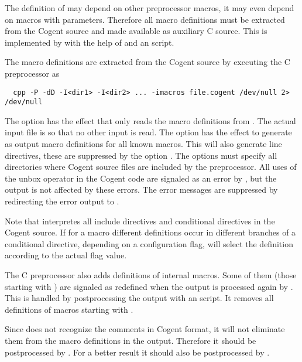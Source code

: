 The definition of  may depend on other preprocessor macros, it may even depend on macros with parameters.
Therefore all macro definitions must be extracted from the Cogent source and made available as auxiliary C source.
This is implemented by  with the help of  and an  script.

The macro definitions are extracted from the Cogent source  by executing the C preprocessor as
\begin{verbatim}
  cpp -P -dD -I<dir1> -I<dir2> ... -imacros file.cogent /dev/null 2> /dev/null
\end{verbatim}
The option  has the effect that  only reads the macro definitions from .
The actual input file is  so that no other input is read. The option  has the effect
to generate as output macro definitions for all known macros. This will also generate line directives, these are
suppressed by the option . The  options must specify all directories where Cogent source files
are included by the preprocessor. All uses of the unbox operator \code{\#} in the Cogent code are signaled as an 
error by , but the output is not affected by these errors. The error messages are suppressed by redirecting
the error output to .

Note that  interpretes all include directives and conditional directives in the Cogent source. If for a macro
different definitions occur in different branches of a conditional directive, depending on a configuration flag,
 will select the definition according to the actual flag value.

The C preprocessor also adds definitions of internal macros. Some of them (those starting with ) are 
signaled as redefined when the output is processed again by . This is handled
by postprocessing the output with an  script. It removes all definitions of macros starting with .

Since  does not recognize the comments in Cogent format, it will not eliminate them from the macro definitions 
in the output. Therefore it should be postprocessed by . For a better result it should also 
be postprocessed by .

\subsubsection{}

